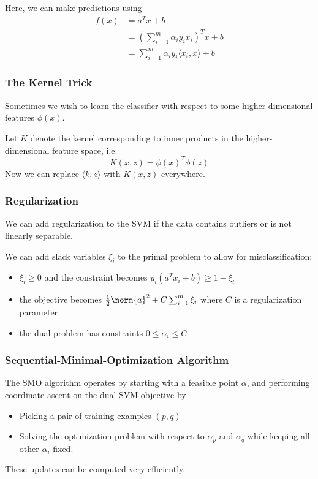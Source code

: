 \documentclass[11pt]{article}
\begin{document}
Here, we can make predictions using 
\begin{align*}
    f(x) &= a^Tx + b \\ 
    &= \left( \sum_{i=1}^m \alpha_iy_ix_i \right)^Tx + b \\
    &= \sum_{i=1}^m \alpha_iy_i \langle x_i, x \rangle + b
\end{align*}

\subsubsection*{The Kernel Trick}
Sometimes we wish to learn the classifier with respect to some higher-dimensional features $\phi(x)$. \par

Let $K$ denote the kernel corresponding to inner products in the higher-dimensional feature space, i.e. 
\[ K(x, z) = \phi(x)^T\phi(z) \] 
Now we can replace $\langle k, z \rangle$ with $K(x, z)$ everywhere.

\subsubsection*{Regularization}
We can add regularization to the SVM if the data contains outliers or is not linearly separable. \par

We can add slack variables $\xi_i$ to the primal problem to allow for misclassification:
\begin{itemize}
    \item $\xi_i \geq 0$ and the constraint becomes $y_i(a^Tx_i + b) \geq 1 - \xi_i$
    \item the objective becomes $\frac{1}{2}\norm{a}^2 + C\sum_{i=1}^m \xi_i$ where $C$ is a regularization parameter
    \item the dual problem has constraints $0 \leq \alpha_i \leq C$
\end{itemize}

\subsubsection*{Sequential-Minimal-Optimization Algorithm} 
The SMO algorithm operates by starting with a feasible point $\alpha$, and performing coordinate ascent on the dual SVM objective by 
\begin{itemize}
    \item Picking a pair of training examples $(p, q)$ 
    \item Solving the optimization problem with respect to $\alpha_p$ and $\alpha_q$ while keeping all other $\alpha_i$ fixed. 
\end{itemize}
These updates can be computed very efficiently. \par 
\end{document}
